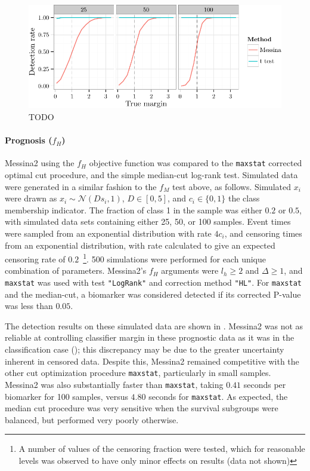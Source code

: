 \documentclass[dissertation.tex]{subfiles}
\begin{document}
\begin{figure}[!htbp]
\centering
\includegraphics[width=\linewidth]{analysis/messina/figure/06-E2A-E2A-plots-1}
\caption[TODO]{TODO}\label{fig:mess-vs-t}
\end{figure}

\paragraph{Prognosis ($f_H$)}
Messina2 using the $f_H$ objective function was compared to the \texttt{maxstat} corrected optimal cut procedure, and the simple median-cut log-rank test.  Simulated data were generated in a similar fashion to the $f_M$ test above, as follows.  Simulated $x_i$ were drawn as $x_i \sim \mathcal{N}(D s_i, 1)$, $D \in [0, 5]$, and $c_i \in \{0, 1\}$ the class membership indicator.  The fraction of class 1 in the sample was either $0.2$ or $0.5$, with simulated data sets containing either 25, 50, or 100 samples.  Event times were sampled from an exponential distribution with rate $4 c_i$, and censoring times from an exponential distribution, with rate calculated to give an expected censoring rate of $0.2$~\footnote{A number of values of the censoring fraction were tested, which for reasonable levels was observed to have only minor effects on results (data not shown)}.  500 simulations were performed for each unique combination of parameters.  Messina2's $f_H$ arguments were $l_h \geq 2$ and $\Delta \geq 1$, and \texttt{maxstat} was used with test \texttt{"LogRank"} and correction method \texttt{"HL"}.  For \texttt{maxstat} and the median-cut, a biomarker was considered detected if its corrected P-value was less than $0.05$.

The detection results on these simulated data are shown in .  Messina2 was not as reliable at controlling classifier margin in these prognostic data as it was in the classification case (); this discrepancy may be due to the greater uncertainty inherent in censored data.  Despite this, Messina2 remained competitive with the other cut optimization procedure \texttt{maxstat}, particularly in small samples.  Messina2 was also substantially faster than \texttt{maxstat}, taking $0.41$ seconds per biomarker for 100 samples, versus $4.80$ seconds for \texttt{maxstat}.  As expected, the median cut procedure was very sensitive when the survival subgroups were balanced, but performed very poorly otherwise.
\end{document}
